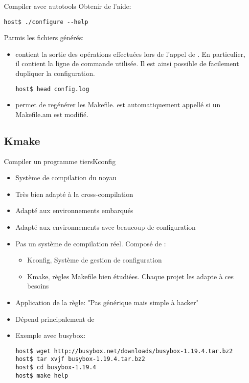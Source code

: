 \begin{frame}[fragile=singleslide]{Compiler avec autotools}
  Obtenir de l'aide:
\begin{lstlisting}
host$ ./configure --help
\end{lstlisting} %

  Parmis les fichiers générés:
  \begin{itemize}
  \item {}  contient la sortie  des opérations effectuées
    lors de l'appel de .  En particulier, il contient
    la ligne de commande utilisée. Il est ainsi possible de facilement
    dupliquer la configuration.
\begin{lstlisting}
host$ head config.log
\end{lstlisting} %
  \item     {}     permet     de    regénérer     les
    Makefile.   est  automatiquement appellé  si un
    Makefile.am est modifié.
  \end{itemize}
\end{frame}


\subsection{Kmake}

\begin{frame}[fragile=singleslide]{Compiler un programme tiers}{Kconfig}
  \begin{itemize}
  \item Système de compilation du noyau
  \item Très bien adapté à la cross-compilation
  \item Adapté aux environnements embarqués
  \item Adapté aux environnements avec beaucoup de configuration
  \item  Pas un  système de  compilation réel. Composé de :
    \begin{itemize}
    \item Kconfig, Système de gestion de configuration
    \item  Kmake, règles  Makefile  bien étudiées.  Chaque projet  les
      adapte à ces besoins
    \end{itemize}
  \item Application de la règle: "Pas générique mais simple à hacker"
  \item Dépend principalement de 
  \item Exemple avec busybox:
    \begin{lstlisting}
host$ wget http://busybox.net/downloads/busybox-1.19.4.tar.bz2
host$ tar xvjf busybox-1.19.4.tar.bz2
host$ cd busybox-1.19.4
host$ make help
    \end{lstlisting} %
  \end{itemize}
\end{frame}

